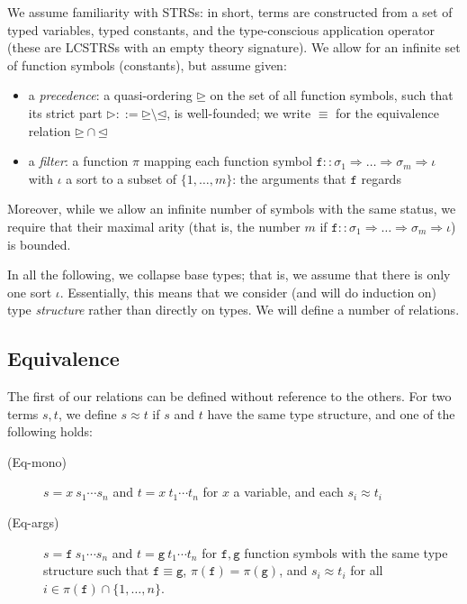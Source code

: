 \documentclass[a4paper,USenglish,cleveref,autoref,thm-restate]{lipics-v2021}
\newcommand{\arrtype}{\Rightarrow}
\newcommand{\ismain}{\approx}
\newcommand{\grpred}{\rhd}
\newcommand{\geqpred}{\unrhd}
\newcommand{\leqpred}{\unlhd}
\newcommand{\eqpred}{\equiv}
\newcommand{\symb}[1]{\mathtt{#1}}
\newcommand{\afun}{\symb{f}}
\newcommand{\bfun}{\symb{g}}
\newcommand{\atype}{\sigma}
\newcommand{\asort}{\iota}
\newcommand{\avar}{x}
\newcommand{\filter}{\pi}
\begin{document}
We assume familiarity with STRSs: in short, terms are constructed from a set of typed variables,
typed constants, and the type-conscious application operator (these are LCSTRSs with an empty
theory signature).
We allow for an infinite set of function symbols (constants), but assume given:
\begin{itemize}
\item a \emph{precedence}: a quasi-ordering $\geqpred$ on the set of all function symbols, such
  that its strict part $\grpred ::= \geqpred \setminus \leqpred$, is well-founded;
  we write $\eqpred$ for the equivalence relation $\geqpred \cap \leqpred$  
\item a \emph{filter}: a function $\filter$ mapping each function symbol $\afun :: \atype_1
  \arrtype \dots \arrtype \atype_m \arrtype \asort$ with $\asort$ a sort to a subset of
  $\{1,\dots,m\}$: the arguments that $\afun$ regards
\end{itemize}
Moreover, while we allow an infinite number of symbols with the same status, we require that their
maximal arity (that is, the number $m$ if $\afun :: \atype_1 \arrtype \dots \arrtype \atype_m
\arrtype \asort$) is bounded.

\medskip
In all the following, we collapse base types; that is, we assume that there is only one sort
$\asort$.  Essentially, this means that we consider (and will do induction on) type \emph{structure}
rather than directly on types.
We will define a number of relations.

\subsection{Equivalence}
The first of our relations can be defined without reference to the others.
For two terms $s,t$, we define $s \ismain t$ if $s$ and $t$ have the same type structure, and one of
the following holds:
\begin{description}
\item[(Eq-mono)] $s = \avar\ s_1 \cdots s_n$ and $t = \avar\ t_1 \cdots t_n$ for $\avar$ a variable,
  and each $s_i \ismain t_i$
\item[(Eq-args)] $s = \afun\ s_1 \cdots s_n$ and $t = \bfun\ t_1 \cdots t_n$ for $\afun,\bfun$
  function symbols with the same type structure such that
  $\afun \eqpred \bfun$,
  $\filter(\afun) = \filter(\bfun)$, and 
  $s_i \ismain t_i$ for all $i \in \filter(\afun) \cap \{1,\dots,n\}$.
\end{description}
\end{document}
